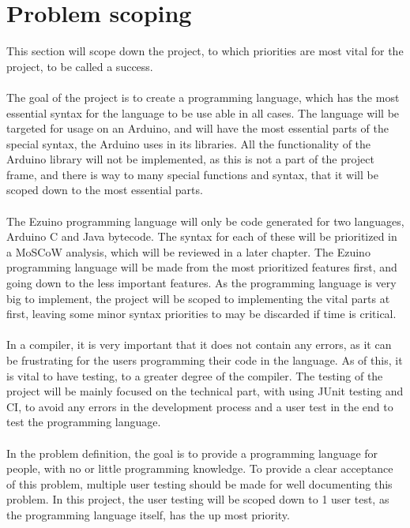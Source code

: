 \section{Problem scoping}
This section will scope down the project, to which priorities are most vital for the project, to be called a success. \\
\\
The goal of the project is to create a programming language, which has the most essential syntax for the language to be use able in all cases. The language will be targeted for usage on an Arduino, and will have the most essential parts of the special syntax, the Arduino uses in its libraries. All the functionality of the Arduino library will not be implemented, as this is not a part of the project frame, and there is way to many special functions and syntax, that it will be scoped down to the most essential parts. \\
\\
The Ezuino programming language will only be code generated for two languages, Arduino C and Java bytecode. The syntax for each of these will be prioritized in a MoSCoW analysis, which will be reviewed in a later chapter. The Ezuino programming language will be made from the most prioritized features first, and going down to the less important features. As the programming language is very big to implement, the project will be scoped to implementing the vital parts at first, leaving some minor syntax priorities to may be discarded if time is critical. \\
\\
In a compiler, it is very important that it does not contain any errors, as it can be frustrating for the users programming their code in the language. As of this, it is vital to have testing, to a greater degree of the compiler. The testing of the project will be mainly focused on the technical part, with using JUnit testing and CI, to avoid any errors in the development process and a user test in the end to test the programming language. \\
\\ 
In the problem definition, the goal is to provide a programming language for people, with no or little programming knowledge. To provide a clear acceptance of this problem, multiple user testing should be made for well documenting this problem. In this project, the user testing will be scoped down to 1 user test, as the programming language itself, has the up most priority.

